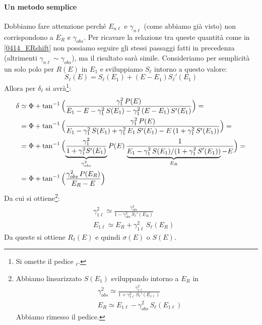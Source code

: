 \paragraph{Un metodo semplice} Dobbiamo fare attenzione perché $E_{n\ell}$ e $\gamma_{n\ell}$ (come abbiamo già visto) non corrispondono a $E_R$ e $\gamma_{obs}$. Per ricavare la relazione tra queste quantità come in \eqref{0414_ERshift} non possiamo seguire gli stessi passaggi fatti in precedenza (altrimenti $\gamma_{n\ell} \sim \gamma_{obs}$), ma il risultato sarà simile. Consideriamo per semplicità un solo polo per $R(E)$ in $E_1$ e sviluppiamo $S_\ell$ intorno a questo valore:
$$S_\ell(E) = S_\ell(E_1) + (E-E_1) S_\ell'(E_1)$$
Allora per $\delta_\ell$ si avrà\footnote{Si omette il pedice $_\ell$.}:
\begin{align*}
	\delta &\simeq \Phi + \tan^{-1}{\Bigl ( \frac{\gamma_1^2 \, P(E)}{E_1 - E - \gamma^2_1 \, S(E_1)-\gamma^2_1 \, (E-E_1) \, S'(E_1)} \Bigr )} = \\
	&= \Phi + \tan^{-1}{\Bigl ( \frac{\gamma_1^2 \, P(E)}{E_1 - \gamma^2_1 \, S(E_1)+\gamma^2_1 \, E_1 \, S'(E_1) - E \, (1+\gamma^2_1 \, S'(E_1))} \Bigr )} = \\
	&= \Phi + \tan^{-1}{\Bigl ( \underbrace{\frac{\gamma_1^2}{1+\gamma^2_1 S'(E_1)}}_{\gamma^2_{obs}} P(E) \, \frac{1}{\underbrace{E_1 - \gamma_1^2 \, S(E_1)/(1+\gamma_1^2\, S'(E_1))}_{E_R} - E} \Bigr )} = \\
	&= \Phi + \tan^{-1}{\Bigl ( \frac{\gamma^2_{obs}\, P(E_R)}{E_R - E} \Bigr )}
\end{align*}
Da cui si ottiene\footnote{Abbiamo linearizzato $S(E_1)$ sviluppando intorno a $E_R$ in
\begin{align*}
	&\gamma_{obs}^2 \simeq \frac{\gamma_{1\ell}^2}{1+\gamma_{1\ell}^2\, S_{\ell}'(E_{1\ell})}  \\
	&E_{R} \simeq E_{1\ell} - \gamma^2_{obs} \, S_\ell (E_{1\ell}) 	
\end{align*}
Abbiamo rimesso il pedice.}:
\begin{align}
	&\gamma_{1\ell}^2 \simeq \frac{\gamma_{obs}^2}{1-\gamma_{obs}^2\, S_{\ell}'(E_R)} \label{0414_gamma1} \\
	&E_{1\ell} \simeq E_R + \gamma^2_{1\ell} \, S_\ell (E_R) \label{0414_E1}
\end{align}
Da queste si ottiene $R_\ell(E)$ e quindi $\sigma(E)$ o $S(E)$.

